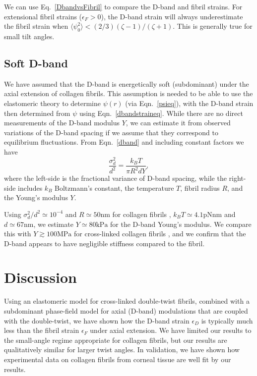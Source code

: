 \documentclass[preprint,12pt]{elsarticle}
\begin{document}
We can use Eq.~\ref{DbandvsFibril} to compare the D-band and fibril strains. For extensional fibril strains ($\epsilon_F>0$), the D-band strain will always underestimate the fibril strain when $\langle\psi_0^2\rangle <(2/3) (\zeta-1)/(\zeta+1)$. This is generally true for small tilt angles.

\subsection{Soft D-band}
We have assumed that the D-band is energetically soft (subdominant) under the axial extension of collagen fibrils. This assumption is needed to be able to use the elastomeric theory to determine $\psi(r)$ (via Eqn.~\ref{psieq}), with the D-band strain then determined from $\psi$ using Eqn.~\ref{dbandstraineq}. While there are no direct measurements of the D-band modulus $Y$, we can estimate it from observed variations of the D-band spacing if we assume that they correspond to equilibrium fluctuations. From Eqn.~\ref{dband} and including constant factors we have \cite{Cameron:2020}
\begin{equation}
    \frac{\sigma^2_d}{d^2} = \frac{k_B T}{\pi R^2 d Y},
\end{equation}
where the left-side is the fractional variance of D-band spacing, while the right-side includes $k_B$ Boltzmann's constant, the temperature $T$, fibril radius $R$, and the Young's modulus $Y$. 

Using $\sigma^2_d/d^2 \simeq 10^{-4}$ and $R \simeq 50\mathrm{nm}$ for collagen fibrils \cite{Fang:2012,Fang:2013B}, $k_B T \simeq 4.1 \mathrm{pN nm}$ and $d \simeq 67\mathrm{nm}$, we estimate $Y \simeq 80 \mathrm{kPa}$ for the D-band Young's modulus. We compare this with $Y \gtrsim 100\mathrm{MPa}$ for cross-linked collagen fibrils \cite{Graham:2004}, and we confirm that the D-band appears to have negligible stiffness compared to the fibril.

\section{Discussion}
\label{sec:discussion}
Using an elastomeric model for cross-linked double-twist fibrils, combined with a subdominant phase-field model for axial (D-band) modulations that are coupled with the double-twist, we have shown how the D-band strain $\epsilon_D$ is typically much less than the fibril strain $\epsilon_F$ under axial extension. We have limited our results to the small-angle regime appropriate for collagen fibrils, but our results are qualitatively similar for larger twist angles. In validation, we have shown how experimental data on collagen fibrils from corneal tissue are well fit by our results. 
\end{document}
